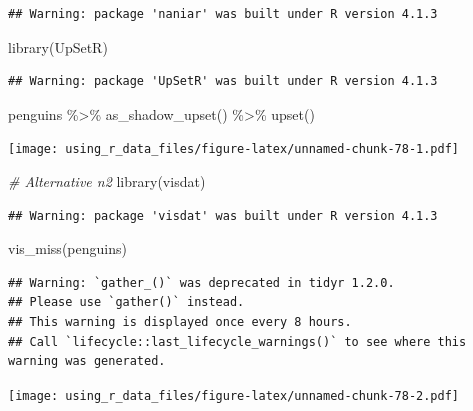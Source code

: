\documentclass[
]{book}
\newenvironment{Shaded}{\begin{snugshade}}{\end{snugshade}}
\newcommand{\CommentTok}[1]{\textcolor[rgb]{0.56,0.35,0.01}{\textit{#1}}}
\newcommand{\FunctionTok}[1]{\textcolor[rgb]{0.00,0.00,0.00}{#1}}
\newcommand{\NormalTok}[1]{#1}
\newcommand{\SpecialCharTok}[1]{\textcolor[rgb]{0.00,0.00,0.00}{#1}}
\begin{document}
\begin{verbatim}
## Warning: package 'naniar' was built under R version 4.1.3
\end{verbatim}

\begin{Shaded}
\begin{Highlighting}[]
\FunctionTok{library}\NormalTok{(UpSetR)}
\end{Highlighting}
\end{Shaded}

\begin{verbatim}
## Warning: package 'UpSetR' was built under R version 4.1.3
\end{verbatim}

\begin{Shaded}
\begin{Highlighting}[]
\NormalTok{penguins }\SpecialCharTok{\%\textgreater{}\%} 
  \FunctionTok{as\_shadow\_upset}\NormalTok{() }\SpecialCharTok{\%\textgreater{}\%} 
  \FunctionTok{upset}\NormalTok{()}
\end{Highlighting}
\end{Shaded}

\texttt{[image: using\_r\_data\_files/figure-latex/unnamed-chunk-78-1.pdf]}

\begin{Shaded}
\begin{Highlighting}[]
\CommentTok{\# Alternative n2}
\FunctionTok{library}\NormalTok{(visdat)}
\end{Highlighting}
\end{Shaded}

\begin{verbatim}
## Warning: package 'visdat' was built under R version 4.1.3
\end{verbatim}

\begin{Shaded}
\begin{Highlighting}[]
\FunctionTok{vis\_miss}\NormalTok{(penguins)}
\end{Highlighting}
\end{Shaded}

\begin{verbatim}
## Warning: `gather_()` was deprecated in tidyr 1.2.0.
## Please use `gather()` instead.
## This warning is displayed once every 8 hours.
## Call `lifecycle::last_lifecycle_warnings()` to see where this warning was generated.
\end{verbatim}

\texttt{[image: using\_r\_data\_files/figure-latex/unnamed-chunk-78-2.pdf]}
\end{document}
